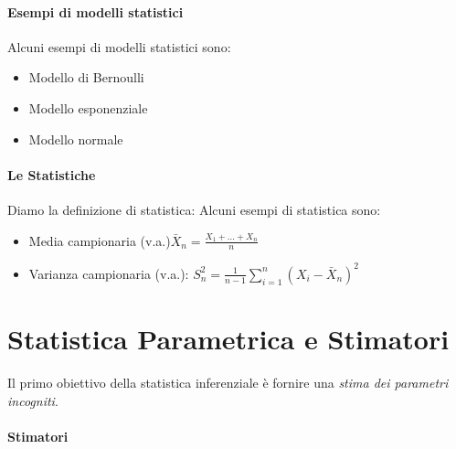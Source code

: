 \paragraph{Esempi di modelli statistici}
Alcuni esempi di modelli statistici sono:
\begin{itemize}
    \item Modello di Bernoulli
    \item Modello esponenziale
    \item Modello normale
\end{itemize}
\paragraph{Le Statistiche}
Diamo la definizione di statistica:
Alcuni esempi di statistica sono:
\begin{itemize}
    \item Media campionaria (v.a.)$\bar{X}_n = \frac{X_1+...+X_n}{n} \quad$ 
    \item Varianza campionaria (v.a.): $S^{2}_n = \frac{1}{n-1} \sum_{i=1}^n(X_i - \bar{X}_n)^2 \quad$
\end{itemize}
\pagebreak

\section{Statistica Parametrica e Stimatori}
Il primo obiettivo della statistica inferenziale è fornire una \emph{stima dei parametri incogniti}.   
\paragraph{Stimatori}


